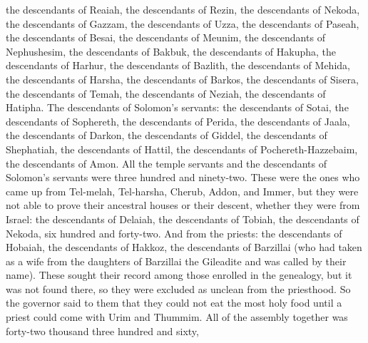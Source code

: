\begin{biblechapter}
\verse the descendants of Reaiah, the descendants of Rezin, the descendants of Nekoda,
\verse the descendants of Gazzam, the descendants of Uzza, the descendants of Paseah,
\verse the descendants of Besai, the descendants of Meunim, the descendants of Nephushesim,
\verse the descendants of Bakbuk, the descendants of Hakupha, the descendants of Harhur,
\verse the descendants of Bazlith, the descendants of Mehida, the descendants of Harsha,
\verse the descendants of Barkos, the descendants of Sisera, the descendants of Temah,
\verse the descendants of Neziah, the descendants of Hatipha.
\verse The descendants of Solomon’s servants: the descendants of Sotai, the descendants of Sophereth, the descendants of Perida,
\verse the descendants of Jaala, the descendants of Darkon, the descendants of Giddel,
\verse the descendants of Shephatiah, the descendants of Hattil, the descendants of Pochereth-Hazzebaim, the descendants of Amon.
\verse All the temple servants and the descendants of Solomon’s servants were three hundred and ninety-two.
\verse These were the ones who came up from Tel-melah, Tel-harsha, Cherub, Addon, and Immer, but they were not able to prove their ancestral houses or their descent, whether they were from Israel:
\verse the descendants of Delaiah, the descendants of Tobiah, the descendants of Nekoda, six hundred and forty-two.
\verse And from the priests: the descendants of Hobaiah, the descendants of Hakkoz, the descendants of Barzillai (who had taken as a wife from the daughters of Barzillai the Gileadite and was called by their name).
\verse These sought their record among those enrolled in the genealogy, but it was not found there, so they were excluded as unclean from the priesthood.
\verse So the governor said to them that they could not eat the most holy food until a priest could come with Urim and Thummim.
\verse All of the assembly together was forty-two thousand three hundred and sixty,

\end{biblechapter}
